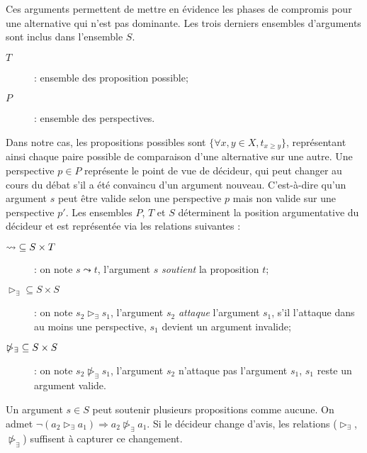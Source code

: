 \documentclass[a4paper, 11pt]{article}
\begin{document}
Ces arguments permettent de mettre en évidence les phases de compromis pour une alternative qui n'est pas dominante. Les trois derniers ensembles d'arguments sont inclus dans l'ensemble $S$.\\

\begin{description}
\item [$T$] : ensemble des proposition possible;
\item [$P$] : ensemble des perspectives.\\
\end{description}

Dans notre cas, les propositions possibles sont $\{\forall x,y \in X, t_{x \geq y} \}$, représentant ainsi chaque paire possible de  comparaison d'une alternative sur une autre. Une perspective $p \in P$ représente le point de vue de décideur, qui peut changer au cours du débat s'il a été convaincu d'un argument nouveau. C'est-à-dire qu'un argument $s$ peut être valide selon une perspective $p$ mais non valide sur une perspective $p'$.
Les ensembles $P$, $T$ et $S$ déterminent la position argumentative du décideur et est représentée via les relations suivantes :\\

\begin{description}
\item [$\leadsto \hspace{.1cm} \subseteq S \times T$] : on note $s \leadsto t$, l'argument $s$ \textit{soutient} la proposition $t$;
\item [$\triangleright_\exists \subseteq S \times S$] : on note $s_2 \triangleright_\exists s_1$, l'argument $s_2$ \textit{attaque} l'argument $s_1$, s'il l'attaque dans au moins une perspective, $s_1$ devient un argument invalide;	
\item [$\ntriangleright_\exists \hspace{.1cm} \subseteq S \times S$] :  on note $s_2 \ntriangleright_\exists s_1$, l'argument $s_2$ n'attaque pas l'argument $s_1$, $s_1$ reste un argument valide.\\
\end{description}

Un argument $s \in S$ peut soutenir plusieurs propositions comme aucune. On  admet $\neg(a_2 \triangleright_\exists a_1 ) \Rightarrow a_2 \ntriangleright_\exists a_1$. Si le décideur change d'avis, les relations ($\triangleright_\exists$, $\ntriangleright_\exists$) suffisent à capturer ce changement.\\
\end{document}
